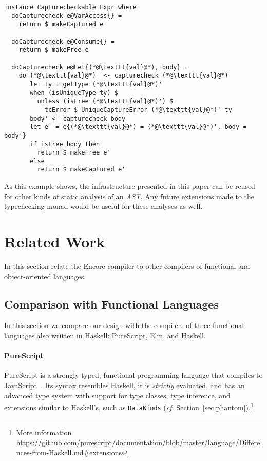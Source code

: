 \documentclass[sigplan,screen]{acmart}
\newcommand{\ELIAS}[1]{\textcolor{orange}{[Elias: #1]}}
\newcommand{\astt}[0]{\textit{AST}}
\begin{document}
\begin{minipage}[t]{.80\linewidth}
\begin{lstlisting}[style=encore]
instance Capturecheckable Expr where
  doCapturecheck e@VarAccess{} =
    return $ makeCaptured e

  doCapturecheck e@Consume{} =
    return $ makeFree e

  doCapturecheck e@Let{(*@\texttt{val}@*), body} =
    do (*@\texttt{val}@*)' <- capturecheck (*@\texttt{val}@*)
       let ty = getType (*@\texttt{val}@*)'
       when (isUniqueType ty) $
         unless (isFree (*@\texttt{val}@*)') $
           tcError $ UniqueCaptureError (*@\texttt{val}@*)' ty
       body' <- capturecheck body
       let e' = e{(*@\texttt{val}@*) = (*@\texttt{val}@*)', body = body'}
       if isFree body then
         return $ makeFree e'
       else
         return $ makeCaptured e'
\end{lstlisting}
\end{minipage}

As this example shows, the infrastructure presented in this paper
can be reused for other kinds of static analysis of an \astt{}.
Any future extensions made to the typechecking monad would be
useful for these analyses as well.

\section{Related Work}


In this section relate the Encore compiler to other compilers of
functional and object-oriented languages.

\subsection{Comparison with Functional Languages}

In this section we compare our design with the compilers of
three functional languages also written in Haskell: PureScript,
Elm, and Haskell.

\paragraph{PureScript}
PureScript is a strongly typed, functional programming language that compiles to JavaScript~\cite{PurescriptBook}.
Its syntax resembles Haskell, it is \emph{strictly} evaluated, and has an advanced type system
with support for type classes, type inference, and extensions similar to Haskell's,
such as \texttt{DataKinds} (\emph{cf.} Section~\ref{sec:phantom}).\footnote{More information
\url{https://github.com/purescript/documentation/blob/master/language/Differences-from-Haskell.md\#extensions}}
\end{document}
